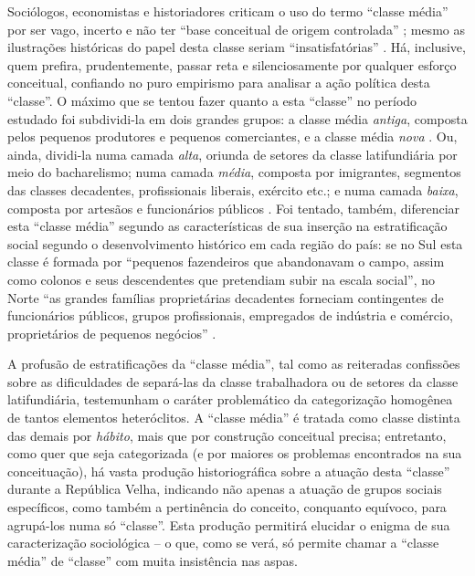Sociólogos, economistas e historiadores criticam o uso do termo ``classe média'' por ser vago, incerto e não ter ``base conceitual de origem controlada'' \cite[p.~19]{POCHMANN2014};  mesmo as ilustrações históricas do papel desta classe seriam ``insatisfatórias'' \cite[p.~9]{pinheiro_clamed_1977}. Há, inclusive, quem prefira, prudentemente, passar reta e silenciosamente por qualquer esforço conceitual, confiando no puro empirismo para analisar a ação política desta ``classe''. O máximo que se tentou fazer quanto a esta ``classe'' no período estudado foi subdividi-la em dois grandes grupos: a classe média \textit{antiga}, composta pelos pequenos produtores e pequenos comerciantes, e a classe média \textit{nova} \cite[p.~11]{pinheiro_clamed_1977}. Ou, ainda, dividi-la numa camada \textit{alta}, oriunda de setores da classe latifundiária por meio do bacharelismo; numa camada \textit{média}, composta por imigrantes, segmentos das classes decadentes, profissionais liberais, exército etc.; e numa camada \textit{baixa}, composta por artesãos e funcionários públicos \cite[p. ~175-176]{CARONE1970inst}. Foi tentado, também, diferenciar esta ``classe média'' segundo as características de sua inserção na estratificação social segundo o desenvolvimento histórico em cada região do país: se no Sul esta classe é formada por ``pequenos fazendeiros que abandonavam o campo, assim como colonos e seus descendentes que pretendiam subir na escala social'', no Norte ``as grandes famílias proprietárias decadentes forneciam contingentes de funcionários públicos, grupos profissionais, empregados de indústria e comércio, proprietários de pequenos negócios''  \cite[p.~16]{pinheiro_clamed_1977}.

A profusão de estratificações da ``classe média'', tal como as reiteradas confissões sobre as dificuldades de separá-las da classe trabalhadora ou de setores da classe latifundiária, testemunham o caráter problemático da categorização homogênea de tantos elementos heteróclitos. A ``classe média'' é tratada como classe distinta das demais por \textit{hábito}, mais que por construção conceitual precisa; entretanto, como quer que seja categorizada (e por maiores os problemas encontrados na sua conceituação), há vasta produção historiográfica sobre a atuação desta ``classe'' durante a República Velha, indicando não apenas a atuação de grupos sociais específicos, como também a pertinência do conceito, conquanto equívoco, para agrupá-los numa só ``classe''. Esta produção permitirá elucidar o enigma de sua caracterização sociológica -- o que, como se verá, só permite chamar a ``classe média'' de ``classe'' com muita insistência nas aspas.

